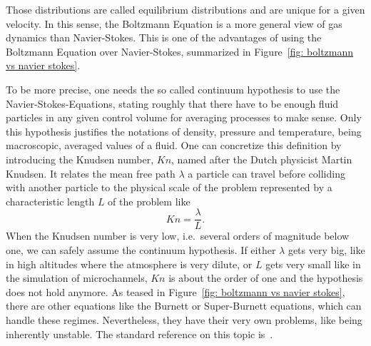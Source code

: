 Those distributions are called equilibrium distributions and are unique for a given velocity.
In this sense, the Boltzmann Equation is a more general view of gas dynamics than Navier-Stokes.
This is one of the advantages of using the Boltzmann Equation over Navier-Stokes, summarized in Figure~\ref{fig: boltzmann vs navier stokes}.

To be more precise, one needs the so called continuum hypothesis to use the Navier-Stokes-Equations, stating roughly that there have to be enough fluid particles in any given control volume for averaging processes to make sense.
Only this hypothesis justifies the notations of density, pressure and temperature, being macroscopic, averaged values of a fluid.
One can concretize this definition by introducing the Knudsen number, $Kn$, named after the Dutch physicist Martin Knudsen.
It relates the mean free path $\lambda$ a particle can travel before colliding with another particle to the physical scale of the problem represented by a characteristic length $L$ of the problem like
\begin{equation}
  \label{eq: definition of knudsen number}
  Kn=\frac{\lambda}{L}.
\end{equation}
When the Knudsen number is very low, i.e.\ several orders of magnitude below one, we can safely assume the continuum hypothesis.
If either $\lambda$ gets very big, like in high altitudes where the atmosphere is very dilute, or $L$ gets very small like in the simulation of microchannels, $Kn$ is about the order of one and the hypothesis does not hold anymore.
As teased in Figure~\ref{fig: boltzmann vs navier stokes}, there are other equations like the Burnett or Super-Burnett equations, which can handle these regimes.
Nevertheless, they have their very own problems, like being inherently unstable.
The standard reference on this topic is~\cite{agarwal2001beyond}.
